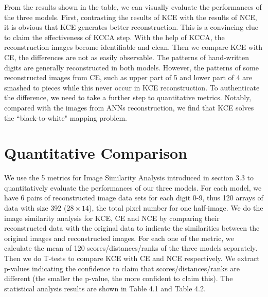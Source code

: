\documentclass[12pt]{report} %
\begin{document}
From the results shown in the table, we can visually evaluate the performances of the three models. First, contrasting the results of KCE with the results of NCE, it is obvious that KCE generates better reconstruction. This is a convincing clue to claim the effectiveness of KCCA step. With the help of KCCA, the reconstruction images become identifiable and clean. Then we compare KCE with CE, the differences are not as easily observable. The patterns of hand-written digits are generally reconstructed in both models. However, the patterns of some reconstructed images from CE, such as upper part of 5 and lower part of 4 are smashed to pieces while this never occur in KCE reconstruction. To authenticate the difference, we need to take a further step to quantitative metrics. Notably, compared with the images from ANNs reconstruction, we find that KCE solves the ``black-to-white" mapping problem.

\section{Quantitative Comparison}
We use the 5 metrics for Image Similarity Analysis introduced in section 3.3 to quantitatively evaluate the performances of our three models. For each model, we have 6 pairs of reconstructed image data sets for each digit 0-9, thus 120 arrays of data with size 392 ($28 \times 14$), the total pixel number for one half-image. We do the image similarity analysis for KCE, CE and NCE by comparing their reconstructed data with the original data to indicate the similarities between the original images and reconstructed images. For each one of the metric, we calculate the mean of 120 scores/distances/ranks of the three models separately. Then we do T-tests\cite{TTEST} to compare KCE with CE and NCE respectively. We extract p-values indicating the confidence to claim that scores/distances/ranks are different (the smaller the p-value, the more confident to claim this). The statistical analysis results are shown in Table 4.1 and Table 4.2.
\end{document}
